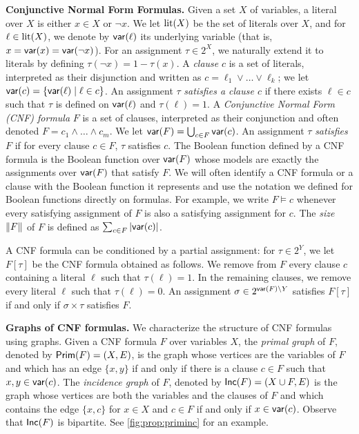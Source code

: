 \documentclass[a4paper,UKenglish,cleveref, autoref, thm-restate]{lipics-v2021}
\newcommand{\guy}[1]{\todo[color=purple]{\color{white}{{\bf Guy}: #1}}}
\begin{document}
\textbf{Conjunctive Normal Form Formulas.} %
Given a set $X$ of variables, a literal over $X$ is either $x \in X$ or $\neg x$. We let $\operatorname{lit}(X)$ be the set of literals over $X$, and for $\ell \in \operatorname{lit}(X)$, we denote by $\mathsf{var}(\ell)$ its underlying variable (that is, $x = \mathsf{var}(x) = \mathsf{var}(\neg x)$). For an assignment $\tau \in 2^X$, we naturally extend it to literals by defining $\tau(\neg x) = 1-\tau(x)$.
% 
A \emph{clause} $c$ is a set of literals, interpreted as their disjunction and written as $c = \ell_1 \vee \dots \vee \ell_k$;
we let $\mathsf{var}(c) = \{\mathsf{var}(\ell)\mid \ell \in c\}$. 
An assignment $\tau$ \emph{satisfies a clause $c$} if there exists $\ell \in c$ such that $\tau$ is defined on $\mathsf{var}(\ell)$ and $\tau(\ell) = 1$.
% 
A \emph{Conjunctive Normal Form (CNF) formula} $F$ is a set of clauses, interpreted as their conjunction and often denoted $F=c_1 \wedge \dots \wedge c_m$. We let $\mathsf{var}(F) = \bigcup_{c \in F} \mathsf{var}(c)$. 
An assignment $\tau$ \emph{satisfies $F$}
if for every clause $c \in F$, $\tau$ satisfies $c$. The Boolean function defined by a CNF formula is the Boolean function over $\mathsf{var}(F)$ whose models are exactly the assignments over $\mathsf{var}(F)$ that satisfy $F$. We will often identify a CNF formula or a clause with the Boolean function it represents and use the notation we defined for Boolean functions directly on formulas. For example, we write $F \models c$ whenever every satisfying assignment of $F$ is also a satisfying assignment for $c$.
%
The \emph{size $\|F\|$} of $F$ is defined as $\sum_{c \in F} |\mathsf{var}(c)|$.

A CNF formula can be conditioned by a partial assignment: for $\tau \in 2^Y$, we let $F[\tau]$ be the CNF formula obtained as follows. We remove from $F$ every clause $c$ containing a literal $\ell$ such that $\tau(\ell)=1$. In the remaining clauses, we remove every literal $\ell$ such that $\tau(\ell)=0$. An assignment $\sigma \in 2^{\mathsf{var}(F) \setminus Y}$ satisfies $F[\tau]$ if and only if $\sigma \times \tau$ satisfies $F$.

\textbf{Graphs of CNF formulas.} We characterize the structure of CNF formulas using graphs. Given a CNF formula $F$ over variables $X$, the \emph{primal graph} of $F$, denoted by $\gprim = (X,E)$, is the graph whose vertices are the variables of $F$ and which has an edge $\{x,y\}$ if and only if there is a clause $c \in F$ such that $x,y \in \mathsf{var}(c)$.
%
The \emph{incidence graph} of $F$, denoted by $\ginc = (X \cup F, E)$ is the graph whose vertices are both the variables and the clauses of $F$ and which contains the edge $\{x,c\}$ for $x \in X$ and $c \in F$ if and only if $x \in \mathsf{var}(c)$.
%
Observe that $\ginc$ is bipartite. See \cref{fig:prop:priminc} for an example.
\end{document}
